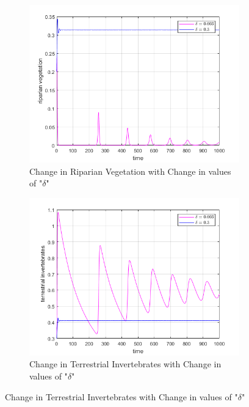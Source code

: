 \documentclass[12pt]{article}
\numberwithin{equation}{section}
\begin{document}
\FloatBarrier
\begin{figure}[bp!]
	\centering
	\begin{subfigure}[t]{0.45\textwidth}
		\centering
	\includegraphics[width=\textwidth]{time_vs_riparian_delta.png}
		\caption{Change in Riparian Vegetation with Change in values of "$\delta$"} \label{fig:time_vs_riparian_delta}
	\end{subfigure}
\hspace{0.08\textwidth}
        \begin{subfigure}[t]{0.45\textwidth}
                 \centering
         \includegraphics[width=\textwidth]{time_vs_invertebrates_delta.png}
		\caption{Change in Terrestrial Invertebrates with Change in values of "$\delta$"} \label{fig:time_vs_invertebrates_delta}

\end{subfigure}
\end{figure}
\end{document}
